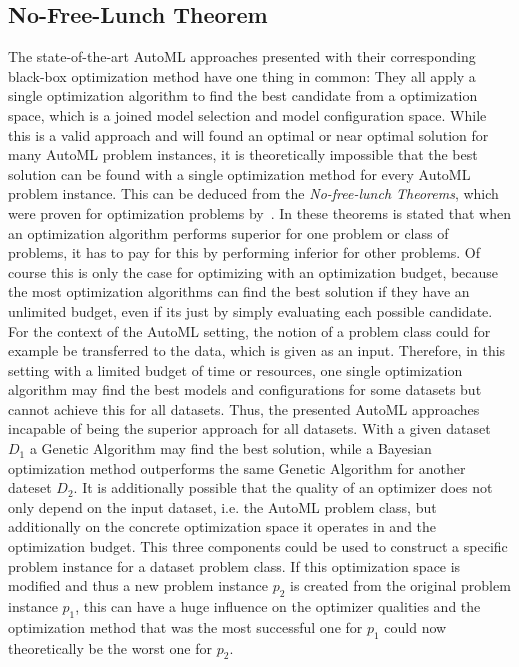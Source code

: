 \subsection{No-Free-Lunch Theorem}
\label{sec:theory:optimization:lunch}
The state-of-the-art AutoML approaches presented with their corresponding black-box optimization method have one thing in common: They all apply a single optimization algorithm to find the best candidate from a optimization space, which is a joined model selection and model configuration space.
While this is a valid approach and will found an optimal or near optimal solution for many AutoML problem instances, it is theoretically impossible that the best solution can be found with a single optimization method for every AutoML problem instance.
This can be deduced from the \textit{No-free-lunch Theorems}, which were proven for optimization problems by~\textcite{Wolpert-No-Free-Lunch-Theorems}.
In these theorems is stated that when an optimization algorithm performs superior for one problem or class of problems, it has to pay for this by performing inferior for other problems.
Of course this is only the case for optimizing with an optimization budget, because the most optimization algorithms can find the best solution if they have an unlimited budget, even if its just by simply evaluating each possible candidate.\newline
For the context of the AutoML setting, the notion of a problem class could for example be transferred to the data, which is given as an input.
Therefore, in this setting with a limited budget of time or resources, one single optimization algorithm may find the best models and configurations for some datasets but cannot achieve this for all datasets.
Thus, the presented AutoML approaches incapable of being the superior approach for all datasets.
With a given dataset $D_1$ a Genetic Algorithm may find the best solution, while a Bayesian optimization method outperforms the same Genetic Algorithm for another dateset $D_2$.\newline
It is additionally possible that the quality of an optimizer does not only depend on the input dataset, i.e. the AutoML problem class, but additionally on the concrete optimization space it operates in and the optimization budget.
This three components could be used to construct a specific problem instance for a dataset problem class.
If this optimization space is modified and thus a new problem instance $p_2$ is created from the original problem instance $p_1$, this can have a huge influence on the optimizer qualities and the optimization method that was the most successful one for $p_1$ could now theoretically be the worst one for $p_2$.\newline
